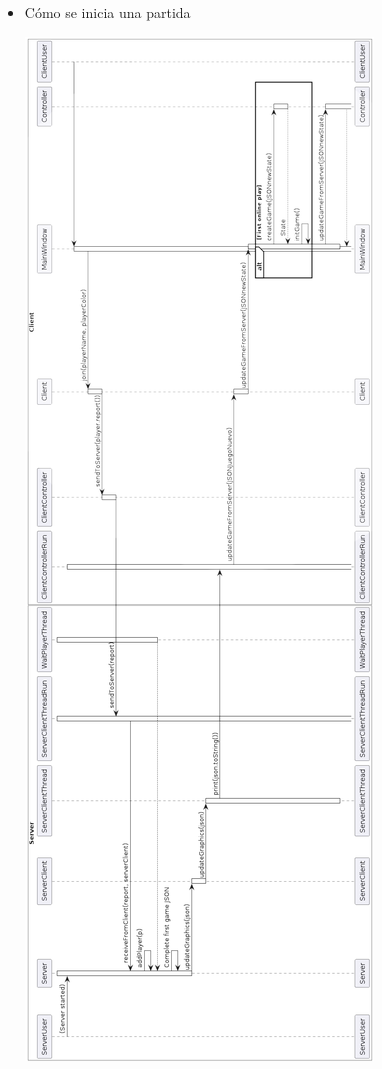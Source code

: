 \documentclass[../DocumentoOficial.tex]{subfiles}
\begin{document}
\begin{sprint}[5]
\begin{itemize}
\item Cómo se inicia una partida

\begin{center}
\includegraphics[scale=0.42]{empezarPartidaUmlSprint5.png} 
\end{center}


\end{itemize}
\end{sprint}
\end{document}
